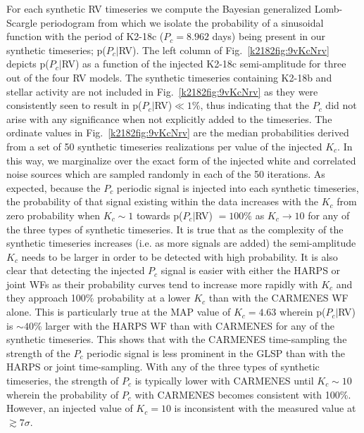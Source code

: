 For each synthetic RV timeseries we compute the Bayesian generalized Lomb-Scargle periodogram
\citep[GLSP;][]{mortier15} from which we isolate the probability of a sinusoidal function with the period of
K2-18c ($P_c=8.962$ days) being present in our synthetic timeseries; p($P_c|$RV).
The left column of Fig.~\ref{k2182fig:9vKcNrv} depicts p($P_c|$RV) as a function of the injected K2-18c semi-amplitude for
three out of the four RV models. 
The synthetic timeseries containing K2-18b and stellar activity are not included in Fig.~\ref{k2182fig:9vKcNrv} as
they were consistently seen to result in p($P_c|$RV)$\ll 1$\%, thus indicating that the $P_c$ did not arise with any
significance when not explicitly added to the timeseries. The ordinate values in
Fig.~\ref{k2182fig:9vKcNrv} are the median probabilities derived from a set of 50 synthetic timeseries realizations
per value of the injected $K_c$. In this way, we marginalize over the exact form of the injected white and correlated
noise sources which are sampled randomly in each of the 50 iterations.
As expected, because the $P_c$ periodic signal is injected into each synthetic timeseries,
the probability of that signal existing within the data increases with the $K_c$ from  zero probability
when $K_c\sim 1$ \mps{} towards p($P_c|$RV) $= 100$\% as $K_c \to 10$ \mps{} for any of the three types of synthetic
timeseries. It is true that as the complexity of the synthetic timeseries
increases (i.e. as more signals are added) the semi-amplitude $K_c$ needs to be larger in order to be
detected with high probability. It is also clear that detecting the injected $P_c$ signal is easier with either
the HARPS or joint WFs as their probability curves tend to increase more rapidly with $K_c$
and they approach 100\% probability at a lower $K_c$ than with the CARMENES WF alone. This is
particularly true at the MAP value of $K_c=4.63$ \mps{}  wherein
p($P_c|$RV) is $\sim 40$\% larger with the HARPS WF than with CARMENES for any of the synthetic
timeseries. This shows that with the CARMENES time-sampling 
the strength of the $P_c$ periodic signal is less prominent in the GLSP than with the HARPS or
joint time-sampling. With any of the three types of synthetic timeseries, the strength
of $P_c$ is typically lower with CARMENES until $K_c\sim 10$ \mps{} wherein the probability
of $P_c$ with CARMENES becomes consistent with 100\%. However, an injected value of $K_c=10$ \mps{} is
inconsistent with the  measured value at $\gtrsim 7\sigma$. \\

